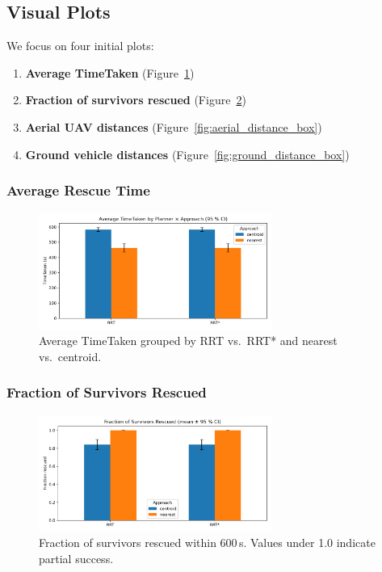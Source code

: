 \documentclass[12pt,a4paper]{report}
\begin{document}
\subsection{Visual Plots}
We focus on four initial plots:
\begin{enumerate}
    \item \textbf{Average TimeTaken} (Figure~\ref{fig:avg_time_taken})
    \item \textbf{Fraction of survivors rescued} (Figure~\ref{fig:fraction_rescued})
    \item \textbf{Aerial UAV distances} (Figure~\ref{fig:aerial_distance_box})
    \item \textbf{Ground vehicle distances} (Figure~\ref{fig:ground_distance_box})
\end{enumerate}

\subsubsection{Average Rescue Time}
\begin{figure}[H]
  \centering
  \includegraphics[width=0.68\textwidth]{figures/avg_time_taken.png}
  \caption{Average TimeTaken grouped by RRT vs.\ RRT* and nearest vs.\ centroid.}
  \label{fig:avg_time_taken}
\end{figure}

\subsubsection{Fraction of Survivors Rescued}
\begin{figure}[H]
  \centering
  \includegraphics[width=0.68\textwidth]{figures/fraction_rescued.png}
  \caption{Fraction of survivors rescued within 600\,s. Values under 1.0 indicate partial success.}
  \label{fig:fraction_rescued}
\end{figure}
\end{document}
